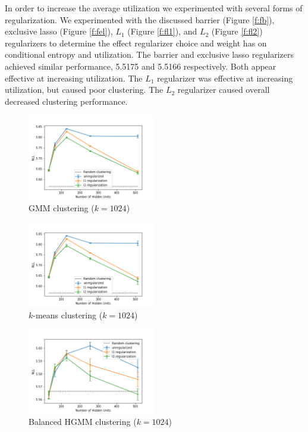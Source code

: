 \documentclass[11pt,letterpaper]{article}
\begin{document}
In order to increase the average utilization we experimented with several forms of regularization. We experimented with the discussed barrier (Figure \ref{f:fb}), exclusive lasso (Figure \ref{f:fel}), $L_1$ (Figure \ref{f:fl1}), and $L_2$ (Figure \ref{f:fl2}) regularizers to determine the effect regularizer choice and weight has on conditional entropy and utilization. The barrier and exclusive lasso regularizers achieved similar performance, 5.5175 and 5.5166 respectively. Both appear effective at increasing utilization. The $L_1$ regularizer was effective at increasing utilization, but caused poor clustering. The $L_2$ regularizer caused overall decreased clustering performance.

\begin{figure}
  \caption{GMM clustering ($k=1024$)}
\label{f:fgmm}
  \centering
    \includegraphics[width=0.5\textwidth]{flat_gmm.png}
\end{figure}

\begin{figure}
  \caption{$k$-means clustering ($k=1024$)}
\label{f:fkm}
  \centering
    \includegraphics[width=0.5\textwidth]{flat_km.png}
\end{figure}

\begin{figure}
  \caption{Balanced HGMM clustering ($k=1024$)}
\label{f:fbgmm}
  \centering
    \includegraphics[width=0.5\textwidth]{flat_bgmm.png}
\end{figure}
\end{document}
